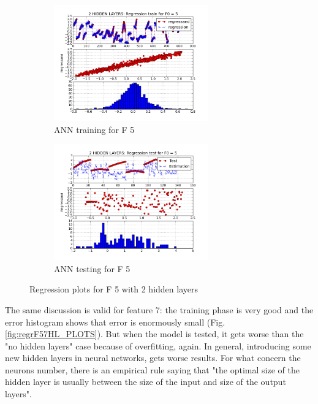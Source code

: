\documentclass{article}
\begin{document}
\begin{figure}[h]
 
\begin{subfigure}{0.5\textwidth}
\includegraphics[width=0.9\linewidth, height=5cm]{pictures/regrF52HL.png} 
\caption{ANN training for F 5}
\label{fig:regrF52HL}
\end{subfigure}
\begin{subfigure}{0.5\textwidth}
\includegraphics[width=0.9\linewidth, height=5cm]{pictures/regrF52HL_TEST.png}
\caption{ANN testing for F 5}
\label{fig:regrF52HL_TEST}
\end{subfigure}
 
\caption{Regression plots for F 5 with 2 hidden layers}
\label{fig:regrF52HL_PLOTS}
\end{figure}

The same discussion is valid for feature 7: the training phase is very good and the error histogram shows that error is enormously small (Fig.\ref{fig:regrF57HL_PLOTS}). But when the model is tested, it gets worse than the "no hidden layers" case because of overfitting, again. In general, introducing some new hidden layers in neural networks, gets worse results. For what concern the neurons number, there is an empirical rule saying that "the optimal size of the hidden layer is usually between the size of the input and size of the output layers".
\end{document}
